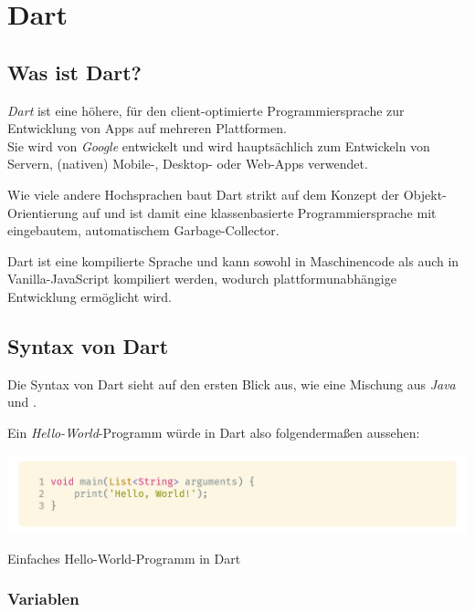 \section{Dart}

\subsection{Was ist Dart?}

\textit{Dart} ist eine höhere, für den client-optimierte Programmiersprache
zur Entwicklung von Apps auf mehreren Plattformen.\\
Sie wird von \textit{Google} entwickelt und wird hauptsächlich zum Entwickeln von
Servern, (nativen) Mobile-, Desktop- oder Web-Apps verwendet.

Wie viele andere Hochsprachen baut Dart strikt auf dem Konzept der Objekt-Orientierung auf
und ist damit eine klassenbasierte Programmiersprache mit eingebautem, automatischem
Garbage-Collector.

Dart ist eine kompilierte Sprache und kann sowohl in Maschinencode als auch in \\
Vanilla-JavaScript kompiliert werden, wodurch plattformunabhängige Entwicklung ermöglicht 
wird.

\subsection{Syntax von Dart}

Die Syntax von Dart sieht auf den ersten Blick aus, wie eine Mischung aus \textit{Java}\\
und .

Ein \textit{Hello-World}-Programm würde in Dart also folgendermaßen aussehen:

\begin{code}
    \centering
    \includegraphics[width=1\textwidth]{images/Dart/dartHelloWorld.png}
    \caption{Einfaches Hello-World-Programm in Dart}
\end{code}

\subsubsection{Variablen}

